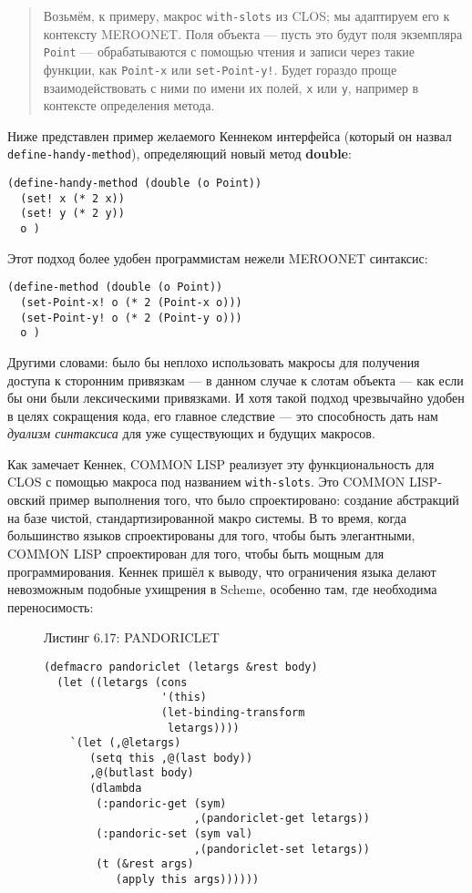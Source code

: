 \begin{quote}Возьмём, к примеру, макрос \verb"with-slots" из CLOS; мы адаптируем его к контексту MEROONET. Поля объекта --- пусть это будут поля экземпляра \verb"Point" --- обрабатываются с помощью чтения и записи через такие функции, как \verb"Point-x" или \verb"set-Point-y!". Будет гораздо проще взаимодействовать с ними по имени их полей, \verb"x" или \verb"y", например в контексте определения метода.\end{quote}

Ниже представлен пример желаемого Кеннеком интерфейса (который он назвал \verb"define-handy-method"), определяющий новый метод \foreignlanguage{english}{\textbf{double}}:

\begin{verbatim}
(define-handy-method (double (o Point))
  (set! x (* 2 x))
  (set! y (* 2 y))
  o )
\end{verbatim}

Этот подход более удобен программистам нежели MEROONET синтаксис:

\begin{verbatim}
(define-method (double (o Point))
  (set-Point-x! o (* 2 (Point-x o)))
  (set-Point-y! o (* 2 (Point-y o)))
  o )
\end{verbatim}

Другими словами: было бы неплохо использовать макросы для получения доступа к сторонним привязкам --- в данном случае к слотам объекта --- как если бы они были лексическими привязками. И хотя такой подход чрезвычайно удобен в целях сокращения кода, его главное следствие --- это способность дать нам \emph{дуализм синтаксиса} для уже существующих и будущих макросов.

Как замечает Кеннек, COMMON LISP реализует эту функциональность для CLOS с помощью макроса под названием \verb"with-slots". Это COMMON LISP-овский пример выполнения того, что было спроектировано: создание абстракций на базе чистой, стандартизированной макро системы. В то время, когда большинство языков спроектированы для того, чтобы быть элегантными, COMMON LISP спроектирован для того, чтобы быть мощным для программирования. Кеннек пришёл к выводу, что ограничения языка делают невозможным подобные ухищрения в Scheme, особенно там, где необходима переносимость:

\begin{figure}Листинг 6.17: PANDORICLET\label{listing_6.17}
\listbegin
\begin{verbatim}
(defmacro pandoriclet (letargs &rest body)
  (let ((letargs (cons
                  '(this)
                  (let-binding-transform
                   letargs))))
    `(let (,@letargs)
       (setq this ,@(last body))
       ,@(butlast body)
       (dlambda
        (:pandoric-get (sym)
                       ,(pandoriclet-get letargs))
        (:pandoric-set (sym val)
                       ,(pandoriclet-set letargs))
        (t (&rest args)
           (apply this args))))))
\end{verbatim}
\listend
\end{figure}

